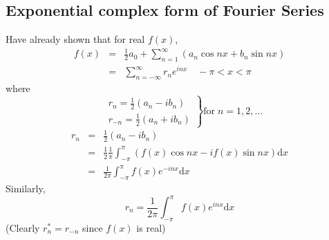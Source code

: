 \documentclass[12pt]{report}
\theoremstyle{definition}
\begin{document}
\subsection{Exponential complex form of Fourier Series}
Have already shown that for real $f(x)$,
\begin{eqnarray*}
    f(x) &=& \frac{1}{2} a_0 + \sum_{n=1}^{\infty} (a_n \cos{nx} + b_n \sin{nx}) \\
         &=& \sum_{n=-\infty}^{\infty} r_n e^{inx} \quad -\pi < x < \pi
\end{eqnarray*}
where\[
    \left. 
    \begin{align*}
        & r_n = \frac{1}{2} (a_n - ib_n) \\
        & r_{-n} = \frac{1}{2} (a_n + ib_n)
    \end{align*}
\right\} \text{for} \;n = 1,2,\ldots
\]
\begin{eqnarray*}
    r_n &=& \frac{1}{2} (a_n - ib_n) \\
        &=& \frac{1}{2} \frac{1}{\pi} \int_{-\pi}^{\pi} (f(x)\cos{nx} - if(x)\sin{nx}) \mathrm{d}x \\
        &=& \frac{1}{2\pi}\int_{-\pi}^{\pi} f(x) e^{-inx}\mathrm{d}x
\end{eqnarray*}
Similarly, \[
    r_n = \frac{1}{2\pi}\int_{-\pi}^{\pi} f(x) e^{inx}\mathrm{d}x
\]
(Clearly $r_n^{*} = r_{-n}$ since $f(x)$ is real)
\medskip
\\
\end{document}
